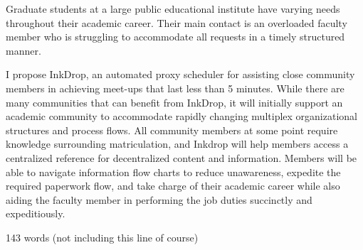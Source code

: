 \documentclass[11pt]{article}
\begin{document}
  Graduate students at a large public educational institute have varying needs throughout their academic career.
  Their main contact is an overloaded faculty member who is struggling to accommodate all requests in a timely structured manner.

  I propose InkDrop, an automated proxy scheduler for assisting close community members in achieving meet-ups that last less than 5 minutes.
  While there are many communities that can benefit from InkDrop, it will initially support an academic community to accommodate rapidly changing multiplex organizational structures and process flows.
  All community members at some point require knowledge surrounding matriculation, and Inkdrop will help members access a centralized reference for decentralized content and information.
  Members will be able to navigate information flow charts to reduce unawareness, expedite the required paperwork flow, and take charge of their academic career while also aiding the faculty member in performing the job duties succinctly and expeditiously.

  143 words (not including this line of course)
\end{document}
